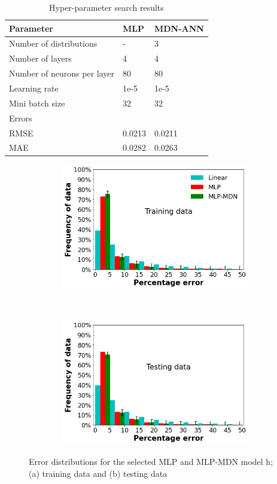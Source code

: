 \documentclass[a4paper,fleqn]{cas-dc}
\begin{document}
\begin{table}[h!]
\caption{Hyper-parameter search results}\label{tbl_hyper_results}
\begin{tabular*}{\tblwidth}{lp{}l}
\toprule
 Parameter& MLP & MDN-ANN \\ %
\midrule
 Number of distributions & - & 3  \\
 Number of layers & 4 & 4\\
 Number of neurons per layer & 80  & 80\\
 Learning rate & 1e-5 &  1e-5   \\
 Mini batch size  &32 & 32  \\
\midrule
Errors & &\\
\midrule
RMSE & 0.0213 & 0.0211\\
MAE & 0.0282& 0.0263\\
\bottomrule
\end{tabular*}
\end{table}  

\begin{figure}[h!]
\centering
    \begin{subfigure}{0.5\textwidth}
    \includegraphics[width=1\textwidth, height =5.5cm]{OVERALL_TRAIN}
    \caption{}
    \end{subfigure}\\
    \begin{subfigure}{0.5\textwidth}
    \includegraphics[width=1\textwidth, height =5.5cm]{OVERALL_TEST}
    \caption{}
    \end{subfigure}
    \caption{Error distributions for the selected MLP and MLP-MDN model h; (a) training data and (b) testing data}\label{fig_frequency_data}
\end{figure}
\end{document}
